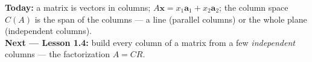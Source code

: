 \documentclass[aspectratio=169, 11pt]{beamer}
\newcommand{\xx}{\mathbf{x}}
\begin{document}
\begin{frame}[t, plain]
  \textbf{Today:} a matrix is vectors in columns; $A\xx=x_1\mathbf{a}_1+x_2\mathbf{a}_2$; the column
  space $C(A)$ is the span of the columns --- a line (parallel columns) or the whole plane
  (independent columns).\\[8pt]
  \textbf{Next --- Lesson 1.4:} build every column of a matrix from a few \emph{independent}
  columns --- the factorization $A=CR$.
\end{frame}
\end{document}
